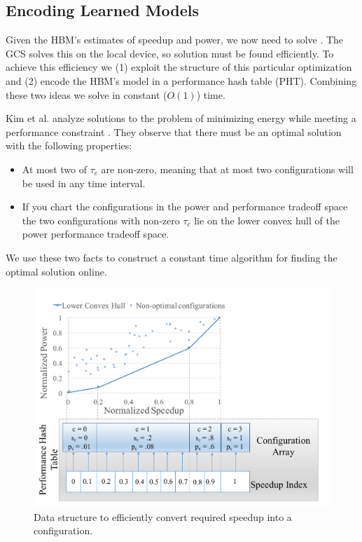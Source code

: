 \subsection{Encoding Learned Models}
Given the HBM's estimates of speedup and power, we now need to solve
.  The GCS solves this on the local device, so
solution must be found efficiently.  To achieve this efficiency we (1)
exploit the structure of this particular optimization and (2) encode
the HBM's model in a performance hash table (PHT).  Combining these
two ideas we solve  in constant ($O(1)$) time.

Kim et al. analyze solutions to the problem of minimizing
energy while meeting a performance constraint \cite{kim-cpsna}.  They
observe that there must be an optimal solution with the following
properties:
\begin{itemize}
\item At most two of $\tau_c$ are non-zero, meaning that at most two
  configurations will be used in any time interval.
\item If you chart the configurations in the power and performance
  tradeoff space the two configurations with non-zero $\tau_c$ lie on
  the lower convex hull of the power performance tradeoff space.
\end{itemize}
We use these two facts to construct a constant time algorithm for
finding the optimal solution online.

\begin{figure}
\includegraphics[width=\columnwidth]{figures/performance-hash-table.pdf}
\caption{Data structure to efficiently convert required speedup into a
  configuration.}
  \label{fig:pht}
\end{figure}

